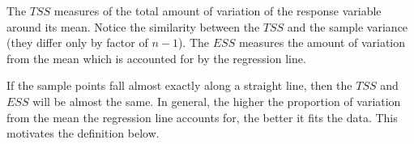 \begin{center}
\begin{minipage}{0.45\textwidth}
\end{minipage}
\end{center}

\begin{keypoint}
The $TSS$ measures of the total amount of variation of the response variable around its mean. Notice the similarity between the $TSS$ and the sample variance (they differ only by factor of $n-1$). The $ESS$ measures the amount of variation from the mean which is accounted for by the regression line.
\end{keypoint}

If the sample points fall almost exactly along a straight line, then the $TSS$ and $ESS$ will be almost the same. In general, the higher the proportion of variation from the mean the regression line accounts for, the better it fits the data.  This motivates the definition below.

